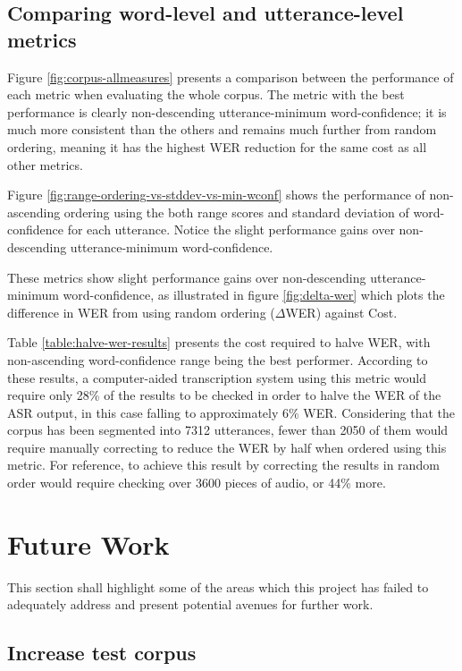 \subsection{Comparing word-level and utterance-level metrics}

Figure \ref{fig:corpus-allmeasures} presents a comparison between the performance of each metric when evaluating the whole corpus.
The metric with the best performance is clearly non-descending utterance-minimum word-confidence; it is much more consistent than the others and remains much further from random ordering, meaning it has the highest WER reduction for the same cost as all other metrics.



Figure \ref{fig:range-ordering-vs-stddev-vs-min-wconf} shows the performance of non-ascending ordering using the both range scores and standard deviation of word-confidence for each utterance. 
Notice the slight performance gains over non-descending utterance-minimum word-confidence.

These metrics show slight performance gains over non-descending utterance-minimum word-confidence, as illustrated in figure \ref{fig:delta-wer} which plots the difference in WER from using random ordering ($\Delta$WER) against Cost.

Table \ref{table:halve-wer-results} presents the cost required to halve WER, with non-ascending word-confidence range being the best performer.
According to these results, a computer-aided transcription system using this metric would require only 28\% of the results to be checked in order to halve the WER of the ASR output, in this case falling to approximately 6\% WER.
Considering that the corpus has been segmented into 7312 utterances, fewer than 2050 of them would require manually correcting to reduce the WER by half when ordered using this metric.
For reference, to achieve this result by correcting the results in random order would require checking over 3600 pieces of audio, or 44\% more.

\section{Future Work}

This section shall highlight some of the areas which this project has failed to adequately address and present potential avenues for further work.

\subsection{Increase test corpus}

